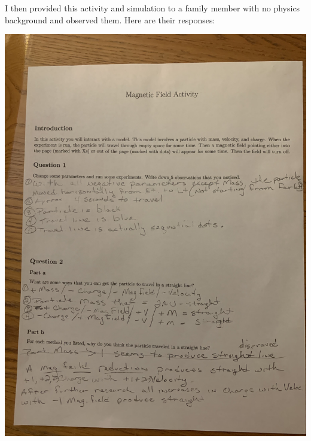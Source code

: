 \documentclass[11pt]{article}
\begin{document}
		I then provided this activity and simulation to a family member with no physics background and observed them. Here are their responses:
		
		\includegraphics[scale = 0.15]{IMG_1}
		
\end{document}
